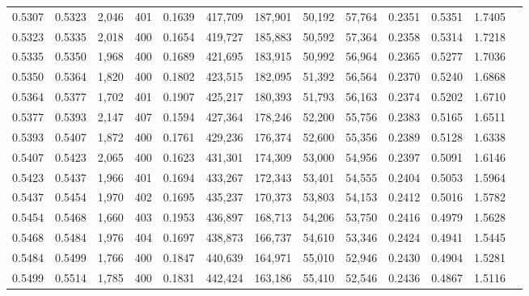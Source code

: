 \begin{tabular}{rrrrrrrrrrrrr}
0.5307 & 0.5323 &  2,046 & 401 &                                     0.1639 & 417,709 & 187,901 &  50,192 &  57,764 & 0.2351 & 0.5351 & 1.7405 \\
0.5323 & 0.5335 &  2,018 & 400 &                                     0.1654 & 419,727 & 185,883 &  50,592 &  57,364 & 0.2358 & 0.5314 & 1.7218 \\
0.5335 & 0.5350 &  1,968 & 400 &                                     0.1689 & 421,695 & 183,915 &  50,992 &  56,964 & 0.2365 & 0.5277 & 1.7036 \\
0.5350 & 0.5364 &  1,820 & 400 &                                     0.1802 & 423,515 & 182,095 &  51,392 &  56,564 & 0.2370 & 0.5240 & 1.6868 \\
0.5364 & 0.5377 &  1,702 & 401 &                                     0.1907 & 425,217 & 180,393 &  51,793 &  56,163 & 0.2374 & 0.5202 & 1.6710 \\
0.5377 & 0.5393 &  2,147 & 407 &                                     0.1594 & 427,364 & 178,246 &  52,200 &  55,756 & 0.2383 & 0.5165 & 1.6511 \\
0.5393 & 0.5407 &  1,872 & 400 &                                     0.1761 & 429,236 & 176,374 &  52,600 &  55,356 & 0.2389 & 0.5128 & 1.6338 \\
0.5407 & 0.5423 &  2,065 & 400 &                                     0.1623 & 431,301 & 174,309 &  53,000 &  54,956 & 0.2397 & 0.5091 & 1.6146 \\
0.5423 & 0.5437 &  1,966 & 401 &                                     0.1694 & 433,267 & 172,343 &  53,401 &  54,555 & 0.2404 & 0.5053 & 1.5964 \\
0.5437 & 0.5454 &  1,970 & 402 &                                     0.1695 & 435,237 & 170,373 &  53,803 &  54,153 & 0.2412 & 0.5016 & 1.5782 \\
0.5454 & 0.5468 &  1,660 & 403 &                                     0.1953 & 436,897 & 168,713 &  54,206 &  53,750 & 0.2416 & 0.4979 & 1.5628 \\
0.5468 & 0.5484 &  1,976 & 404 &                                     0.1697 & 438,873 & 166,737 &  54,610 &  53,346 & 0.2424 & 0.4941 & 1.5445 \\
0.5484 & 0.5499 &  1,766 & 400 &                                     0.1847 & 440,639 & 164,971 &  55,010 &  52,946 & 0.2430 & 0.4904 & 1.5281 \\
0.5499 & 0.5514 &  1,785 & 400 &                                     0.1831 & 442,424 & 163,186 &  55,410 &  52,546 & 0.2436 & 0.4867 & 1.5116 \\

\end{tabular}
